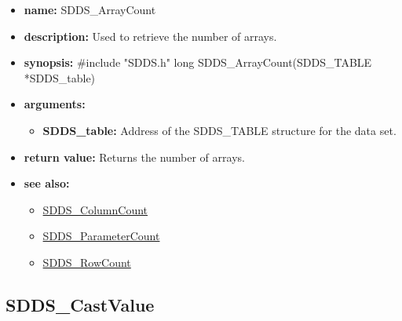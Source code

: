 \documentclass[11pt]{article}
\newcommand{\progref}[1]{\hyperref{SDDS_#1}{{\tt SDDS\_#1} (}{)}{SDDS_#1}}
\begin{document}
\begin{itemize}
\item {\bf name:}\newline
SDDS\_ArrayCount
\item {\bf description:}\newline
Used to retrieve the number of arrays.
\item {\bf synopsis:} \#include "SDDS.h"\newline
long SDDS\_ArrayCount(SDDS\_TABLE *SDDS\_table)
\item {\bf arguments:}
\begin{itemize}
\item {\bf SDDS\_table:} Address of the SDDS\_TABLE structure for the data set.
\end{itemize}
\item {\bf return value:}\newline
Returns the number of arrays.
\item {\bf see also:}
\begin{itemize}
\item \progref{ColumnCount}
\item \progref{ParameterCount}
\item \progref{RowCount}
\end{itemize}
\end{itemize}

\subsection{SDDS\_CastValue}
\label{SDDS_CastValue}
\end{document}
